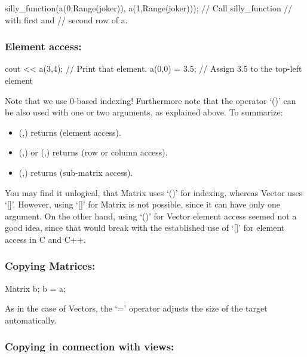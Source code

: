 \begin{code}
silly_function(a(0,Range(joker)),
               a(1,Range(joker))); // Call silly_function
                                   // with first and
                                   // second row of a.
\end{code}



\subsubsection{Element access:}
\begin{code}
cout << a(3,4); // Print that element.
a(0,0) = 3.5;   // Assign 3.5 to the top-left element
\end{code}

Note that we use 0-based indexing! Furthermore note that the operator
`()' can be also used with one or two  arguments, as
explained above. To summarize:

\begin{itemize}
\item (,) returns  (element access).
\item (,) or (,) returns
   (row or column access).
\item (,) returns 
  (sub-matrix access).
\end{itemize}

You may find it unlogical, that Matrix uses `()' for indexing, whereas
Vector uses `[]'. However, using `[]' for Matrix is not possible,
since it can have only one argument. On the other hand, using `()' for
Vector element access seemed not a good idea, since that would break
with the established use of `[]' for element access in C and C++.

\subsubsection{Copying Matrices:}
\begin{code}
Matrix b;
b = a;
\end{code}

As in the case of Vectors, the `=' operator adjusts the size of the
target automatically.

\subsubsection{Copying in connection with views:}

